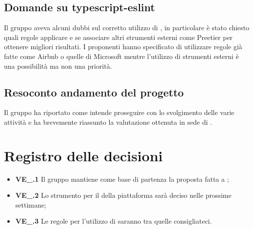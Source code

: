 \subsection{Domande su typescript-eslint}
Il gruppo aveva alcuni dubbi sul corretto utilizzo di , in particolare è stato chiesto quali regole applicare e se associare altri strumenti esterni come Preetier per ottenere migliori risultati. I proponenti hanno specificato di utilizzare regole già fatte come Airbnb o quelle di Microsoft mentre l'utilizzo di strumenti esterni è una possibilità ma non una priorità.
\subsection{Resoconto andamento del progetto}
Il gruppo ha riportato come intende proseguire con lo svolgimento delle varie attività e ha brevemente riassunto la valutazione ottenuta in sede di . 

\section{Registro delle decisioni}
\begin{itemize}
	\item \textbf{VE\_\Data.1} Il gruppo mantiene come base di partenza la proposta fatta a \Proponente;
   \item \textbf{VE\_\Data.2} Lo strumento per il  della piattaforma sarà deciso nelle prossime settimane;
   \item \textbf{VE\_\Data.3} Le regole per l'utilizzo di  saranno tra quelle consigliateci.
\end{itemize}